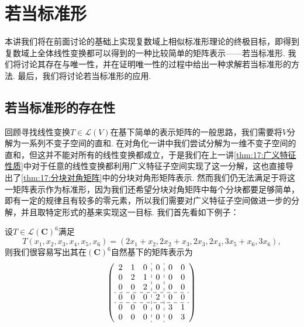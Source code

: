 \chapter{若当标准形}

本讲我们将在前面讨论的基础上实现复数域上相似标准形理论的终极目标，即得到复数域上全体线性变换都可以得到的一种比较简单的矩阵表示——若当标准形. 我们将讨论其存在与唯一性，并在证明唯一性的过程中给出一种求解若当标准形的方法. 最后，我们将讨论若当标准形的应用.

\section{若当标准形的存在性}
回顾寻找线性变换$T\in\mathcal{L}(V)$在基下简单的表示矩阵的一般思路，我们需要将$V$分解为一系列不变子空间的直和. 在对角化一讲中我们尝试分解为一维不变子空间的直和，但这并不能对所有的线性变换都成立，于是我们在上一讲\autoref{thm:17:广义特征性质}中对于任意的线性变换都利用广义特征子空间实现了这一分解，这也直接导出了\autoref{thm:17:分块对角矩阵}中的分块对角形矩阵表示. 然而我们仍无法满足于将这一矩阵表示作为标准形，因为我们还希望分块对角矩阵中每个分块都要足够简单，即有一定的规律且有较多的零元素，所以我们需要对广义特征子空间做进一步的分解，并且取特定形式的基来实现这一目标. 我们首先看如下例子：

\begin{example}
    设$T\in\mathcal{L}(\mathbf{C})^6$满足
    \[T(x_1,x_2,x_3,x_4,x_5,x_6)=(2x_1+x_2,2x_2+x_3,2x_3,2x_4,3x_5+x_6,3x_6),\]
    则我们很容易写出其在$(\mathbf{C})^6$自然基下的矩阵表示为
    \[\left(\begin{array}{ccc:c:cc}
        2 & 1 & 0 & 0 & 0 & 0\\
        0 & 2 & 1 & 0 & 0 & 0\\
        0 & 0 & 2 & 0 & 0 & 0\\
        \hdashline
        0 & 0 & 0 & 2 & 0 & 0\\
        \hdashline
        0 & 0 & 0 & 0 & 3 & 1\\
        0 & 0 & 0 & 0 & 0 & 3\\
        \end{array}\right)\]
\end{example}

